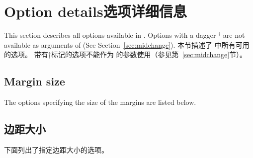 \section{Option details\hfill 选项详细信息}
\begin{paracol}{2}
This section describes all options available in \Gm.
Options with a dagger $^\dagger$ are not available 
as arguments of  (See Section~\ref{sec:midchange}).
\switchcolumn
本节描述了 \Gm 中所有可用的选项。
带有†标记的选项不能作为  的参数使用（参见第~\ref{sec:midchange}节）。
\end{paracol}

% 
% 
% 

\begin{paracol}{2}
\subsection{Margin size}\label{sec:margin}
The options specifying the size of the margins are listed below.
\switchcolumn
\subsection{边距大小}
下面列出了指定边距大小的选项。
\end{paracol}

